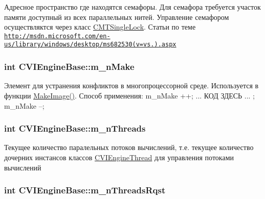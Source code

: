Адресное пространство где находятся семафоры. Для семафора требуется участок памяти доступный из всех параллельных нитей. Управление семафором осуществляктся через класс \hyperlink{class_c_m_t_single_lock}{C\+M\+T\+Single\+Lock}. Статьи по теме \href{http://msdn.microsoft.com/en-us/library/windows/desktop/ms682530(v=vs.85).aspx}{\tt http\+://msdn.\+microsoft.\+com/en-\/us/library/windows/desktop/ms682530(v=vs.).\+aspx} 

\hypertarget{class_c_v_i_engine_base_a4f173a318d25c068952f2c68f4248208}{
\subsubsection[{m\+\_\+n\+Make}]{\setlength{\rightskip}{0pt plus 5cm}int C\+V\+I\+Engine\+Base\+::m\+\_\+n\+Make}}\label{class_c_v_i_engine_base_a4f173a318d25c068952f2c68f4248208}


Элемент для устранения конфликтов в многопроцессорной среде. Используется в функции \hyperlink{class_c_v_i_engine_base_a3426944a03bac2f5a8c135c217f9cf8c}{Make\+Image()}. Способ применения\+: m\+\_\+n\+Make ++; ... КОД ЗДЕСЬ ... ; m\+\_\+n\+Make --; 

\hypertarget{class_c_v_i_engine_base_a0041ab05a40ba6a0bca65c78ea9d8189}{
\subsubsection[{m\+\_\+n\+Threads}]{\setlength{\rightskip}{0pt plus 5cm}int C\+V\+I\+Engine\+Base\+::m\+\_\+n\+Threads}}\label{class_c_v_i_engine_base_a0041ab05a40ba6a0bca65c78ea9d8189}


Текущее количество паралельных потоков вычислений, т.\+е. текущее количество дочерних инстансов классов \hyperlink{class_c_v_i_engine_thread}{C\+V\+I\+Engine\+Thread} для управления потоками вычислений 

\hypertarget{class_c_v_i_engine_base_a36e1cc3cb814a08af53e9b4076b51dae}{
\subsubsection[{m\+\_\+n\+Threads\+Rqst}]{\setlength{\rightskip}{0pt plus 5cm}int C\+V\+I\+Engine\+Base\+::m\+\_\+n\+Threads\+Rqst}}\label{class_c_v_i_engine_base_a36e1cc3cb814a08af53e9b4076b51dae}




